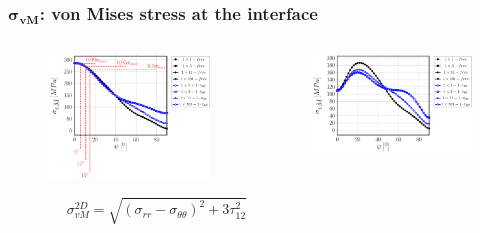 \documentclass[first,firstsupp,lastsupp,last,hyperref,table]{ETHclass}
\begin{document}
\begin{frame}
\frametitle{\vspace{0.2cm}\small $\mathbf{\sigma_{vM}}$: von Mises stress at the interface}
\vspace{-.75cm}
\centering
\begin{columns}[c]
\centering
\begin{column}{0.5\textwidth}
\centering
\begin{figure}
\centering
\includegraphics[width=\columnwidth]{vf60-nodamage-vM2D.pdf}
\end{figure}
\vspace{-0.9cm}
\scriptsize
\begin{equation*}
\qquad\qquad\sigma^{2D}_{vM}=\sqrt{\left(\sigma_{rr}-\sigma_{\theta\theta}\right)^{2}+3\tau_{12}^{2}}
\end{equation*}
\end{column}
\begin{column}{0.5\textwidth}
\centering
\begin{figure}
\centering
\includegraphics[width=\columnwidth]{vf60-nodamage-vM3D.pdf}

\end{figure}
\end{column}
\end{columns}
\end{frame}
\end{document}
